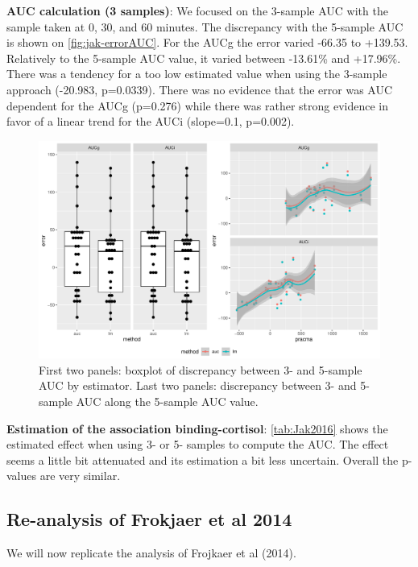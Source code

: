 \documentclass[12pt]{article}
\begin{document}
\bigskip

\textbf{AUC calculation (3 samples)}: We focused on the 3-sample AUC with the
sample taken at 0, 30, and 60 minutes. The discrepancy with the
5-sample AUC is shown on \autoref{fig:jak-errorAUC}. For the AUCg the
error varied -66.35 to +139.53. Relatively to the 5-sample AUC value,
it varied between -13.61\% and +17.96\%. There was a tendency for a too
low estimated value when using the 3-sample approach (-20.983,
p=0.0339). There was no evidence that the error was AUC dependent for
the AUCg (p=0.276) while there was rather strong evidence in favor of
a linear trend for the AUCi (slope=0.1, p=0.002). 

\begin{figure}[!h]
\centering
\includegraphics[width=1\textwidth]{./figures/gg-jak-errorAUC.pdf}
\caption{\label{fig:jak-errorAUC}First two panels: boxplot of discrepancy between 3- and 5-sample AUC by estimator. Last two panels: discrepancy between 3- and 5-sample AUC along the 5-sample AUC value.}
\end{figure}

\bigskip

\textbf{Estimation of the association binding-cortisol}: \autoref{tab:Jak2016} shows
the estimated effect when using 3- or 5- samples to compute the
AUC. The effect seems a little bit attenuated and its estimation a bit
less uncertain. Overall the p-values are very similar.

\subsection{Re-analysis of Frokjaer et al 2014}
\label{sec:org7a854d0}

We will now replicate the analysis of Frojkaer et al (2014).
\end{document}
